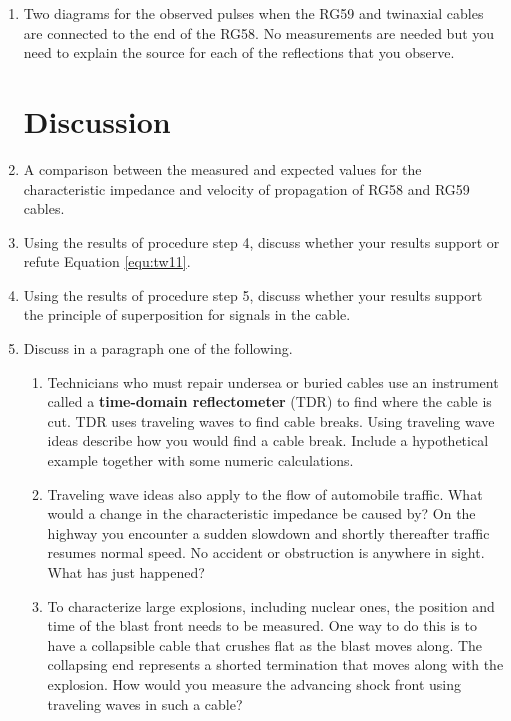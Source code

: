 \begin{enumerate}[resume]
\item Two diagrams for the observed pulses when the RG59 and twinaxial cables are connected to the end of the RG58. No measurements are needed but you need to explain the source for each of the reflections that you observe. 

\section{Discussion}

\item A comparison between the measured and expected values for the characteristic impedance and velocity of propagation of RG58 and RG59 cables.

\item Using the results of procedure step 4, discuss whether your results support or refute Equation \ref{equ:tw11}. 

\item Using the results of procedure step 5, discuss whether your results support the principle of superposition for signals in the cable.

\item Discuss in a paragraph one of the following.

\begin{enumerate}[label=\Alph*)]

\item Technicians who must repair undersea or buried cables use an instrument called a {\bf time-domain reflectometer} (TDR) to find where the cable is cut. TDR uses traveling waves to find cable breaks. Using traveling wave ideas describe how you would find a cable break. Include a hypothetical example together with some numeric calculations.

\item Traveling wave ideas also apply to the flow of automobile traffic. What would a change in the characteristic impedance be caused by? On the highway you encounter a sudden slowdown and shortly thereafter traffic resumes normal speed. No accident or obstruction is anywhere in sight. What has just happened?

\item To characterize large explosions, including nuclear ones, the position and time of the blast front needs to be measured. One way to do this is to have a collapsible cable that crushes flat as the blast moves along. The collapsing end represents a shorted termination that moves along with the explosion. How would you measure the advancing shock front using traveling waves in such a cable?

\end{enumerate}
\end{enumerate}




\AtEndDocument{\clearpage\ifodd\value{page}\else\null\clearpage\fi} %


